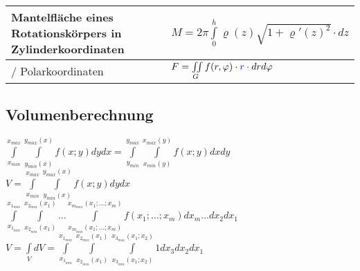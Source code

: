 \begin{tabular}{|p{5.5 cm}|p{10cm}|}
\begin{minipage}{5.5cm}
  		Mantelfläche eines Rotationskörpers in Zylinderkoordinaten    
    \end{minipage}&
	\begin{minipage}{10cm}
    	\vspace{0.1cm}
		$M = 2\pi\int\limits_0^h\varrho(z)\sqrt{1+\varrho'(z)^2}\cdot dz$
    	\vspace{0.1cm}
    \end{minipage}\\
	\hline/
	Polarkoordinaten &
	\begin{minipage}{10cm}
    	\vspace{0.1cm}
		$F=\iint\limits_G f(r,\varphi)\cdot \textcolor{blue}{r} \cdot dr d\varphi $
    	\vspace{0.1cm}
    \end{minipage}\\
	\hline
\end{tabular}

\subsection{Volumenberechnung}
  \begin{multicols}{2}
    $\boxed{\int\limits_{x_{min}}^{x_{max}}\int\limits_{y_{min}(x)}^{y_{max}(x)}f(x;y) dy dx =
    \int\limits_{y_{min}}^{y_{max}}\int\limits_{x_{min}(y)}^{x_{max}(y)}f(x;y) dx dy }$\\
    $\boxed{V = \int\limits_{x_{min}}^{x_{max}}\int\limits_{y_{min}(x)}^{y_{max}(x)}f(x;y) dy dx}$ \\
    
  \columnbreak
    $\boxed{\int\limits_{x_{1_{min}}}^{x_{1_{max}}}\int\limits_{x_{2_{min}}(x_1)}^{x_{2_{max}}(x_1)}\ldots 
    \int\limits_{x_{m_{min}}(x_1;\ldots;x_m)}^{x_{m_{max}}(x_1;\ldots;x_m)}f(x_1;\ldots;x_m)dx_m \ldots dx_2 dx_1}$ \\
    $\boxed{V = \int\limits_V dV = \int\limits_{x_{1_{min}}}^{x_{1_{max}}} \int\limits_{x_{2_{min}}(x_1)}^{x_{2_{max}}(x_1)}
    \int\limits_{x_{3_{min}}(x_1;x_2)}^{x_{3_{max}}(x_1;x_2)}1 dx_3 dx_2 dx_1}$
  \end{multicols}


